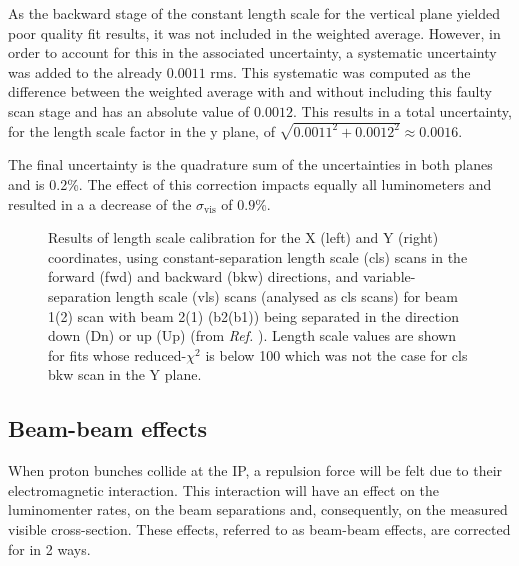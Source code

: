As the backward stage of the constant length scale for the vertical plane yielded poor quality fit results, it was not included in the weighted average. However, in order to account for this in the associated uncertainty, a systematic uncertainty was added to the already $0.0011$ rms. This systematic was computed as the difference between the weighted average with and without including this faulty scan stage and has an absolute value of $0.0012$. This results in a total uncertainty, for the length scale factor in the y plane, of $\sqrt{0.0011^2 + 0.0012^2} \approx 0.0016$.

The final uncertainty is the quadrature sum of the uncertainties in both planes and is 0.2\%. The effect of this correction impacts equally all luminometers and resulted in a a decrease of the $\sigma_{\mathrm{vis}}$ of $0.9\%$.

\begin{figure}[h!]
	\centering
	\caption[Length scale calibration results]{Results of length scale calibration for the X (left) and Y (right) coordinates, using constant-separation length scale (cls) scans in the forward (fwd) and backward (bkw) directions, and variable-separation length scale (vls) scans (analysed as cls scans) for beam 1(2) scan with beam 2(1) (b2(b1)) being separated in the direction down (Dn) or up (Up) (from \textit{Ref.} \cite{CMS-DP-2024-068}). Length scale values are shown for fits whose reduced-$\chi^2$ is below 100 which was not the case for cls bkw scan in the Y plane.}
	\label{fig:length_scale_fit_summary}
\end{figure}

\subsection{Beam-beam effects}

When proton bunches collide at the IP, a repulsion force will be felt due to their electromagnetic interaction. This interaction will have an effect on the luminomenter rates, on the beam separations and, consequently, on the measured visible cross-section. These effects, referred to as beam-beam effects, are corrected for in 2 ways.

